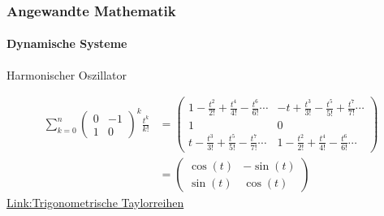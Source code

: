 \documentclass{beamer}
\begin{document}
 \begin{frame}
    \frametitle{Angewandte Mathematik}
\framesubtitle{Dynamische Systeme }
\begin{block}{Harmonischer Oszillator}

\begin{align*}
\sum_{k= 0}^{n} \begin{pmatrix}
    0 & -1  \\ 1 & 0
\end{pmatrix}^{k} \frac{t^k}{k!} & =
\begin{pmatrix}
    1-\frac{t^2}{2!} + \frac{t^4}{4!}-\frac{t^6}{6!} \cdots & -t +\frac{t^3}{3!} - \frac{t^5}{5!} +\frac{t^7}{7!} \cdots  \\ 1 & 0 \\
    t -\frac{t^3}{3!} + \frac{t^5}{5!} -\frac{t^7}{7!} \cdots  & 1-\frac{t^2}{2!} + \frac{t^4}{4!}-\frac{t^6}{6!}  \cdots
\end{pmatrix} \\
&= \begin{pmatrix}
    \cos(t) & -\sin(t)  \\ \sin(t) & \cos(t)
\end{pmatrix}
\end{align*}
\href{https://de.wikipedia.org/wiki/Taylorreihe}{Link:Trigonometrische Taylorreihen}
\end{block}
 \end{frame}
\end{document}
